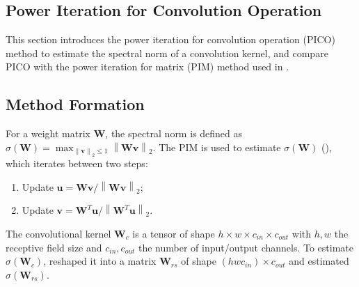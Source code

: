 \documentclass{article} %
\theoremstyle{plain}
\newtheorem*{proposition 1*}{Proposition 1}
\newcommand\norm[1]{\left\lVert#1\right\rVert}
\begin{document}
\begin{appendices}
\section{Power Iteration for Convolution Operation}
\label{sec:pico}

This section introduces the power iteration for convolution operation (PICO) method to estimate the spectral norm of a convolution kernel, and compare PICO with the power iteration for matrix (PIM) method used in \cite{spectral}.

\subsection{Method Formation}
\label{sec:pico_formation}
For a weight matrix \(\bm{W}\), the spectral norm  is defined as \(\sigma(\bm{W})=\max_{\norm{\bm{v}}_2\le1}\norm{\bm{W}\bm{v}}_2\). The PIM is used to estimate \(\sigma(\bm{W})\) (\cite{spectral}), which iterates between two steps:
\begin{enumerate}[leftmargin=*]
	\item Update \(\bm{u}=\bm{W}\bm{v}/\norm{\bm{W}\bm{v}}_2\);
	\item Update \(\bm{v}=\bm{W}^T\bm{u}/\norm{\bm{W}^T\bm{u}}_2\).
\end{enumerate}
The convolutional kernel \(\bm{W}_{c}\) is a tensor of shape \(h\times w\times c_{in}\times c_{out}\) with \(h,w\) the receptive field size and \(c_{in},c_{out}\) the number of input/output channels. To estimate \(\sigma(\bm{W}_{c})\), \cite{spectral} reshaped it into a matrix \(\bm{W}_{rs}\) of shape \((hwc_{in})\times c_{out}\) and estimated \(\sigma(\bm{W}_{rs})\). 


\end{appendices}
\end{document}
